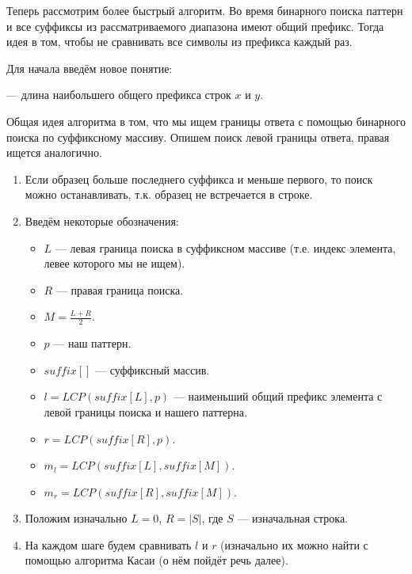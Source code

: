 Теперь рассмотрим более быстрый алгоритм. Во время бинарного поиска паттерн и все суффиксы из
рассматриваемого диапазона имеют общий префикс. Тогда идея в том, чтобы не сравнивать все символы из
префикса каждый раз. 

Для начала введём новое понятие:
\begin{definition}
         --- длина наибольшего общего префикса строк $x$ и $y$. 
\end{definition}

Общая идея алгоритма в том, что мы ищем границы ответа с помощью бинарного поиска по суффиксному
массиву. Опишем поиск левой границы ответа, правая ищется аналогично.

\begin{enumerate}
        \item Если образец больше последнего суффикса и меньше первого, то поиск можно останавливать, т.к.
        образец не встречается в строке.
        \item Введём некоторые обозначения: 
                \begin{itemize}
                        \item $L$ --- левая граница поиска в суффиксном массиве (т.е. индекс элемента,
                                левее которого мы не ищем).
                        \item $R$ --- правая граница поиска.
                        \item $M = \frac{L+R}{2}$. 
                        \item $p$ --- наш паттерн.
                        \item $suffix[]$ --- суффиксный массив.
                        \item $l = LCP(suffix[L], p)$ --- наименьший общий префикс элемента с левой границы
                        поиска и нашего паттерна.
                        \item $r = LCP(suffix[R], p)$.
                        \item $m_{l} = LCP(suffix[L], suffix[M])$.
                        \item  $m_{r} = LCP(suffix[R], suffix[M])$.
                \end{itemize}
        \item Положим изначально $L = 0$, $R = \left| S \right| $, где $S$ --- изначальная строка.
        \item На каждом шаге будем сравнивать $l$ и $r$ (изначально их можно найти с помощью алгоритма Касаи
        (о нём пойдёт речь далее).


\end{enumerate}
